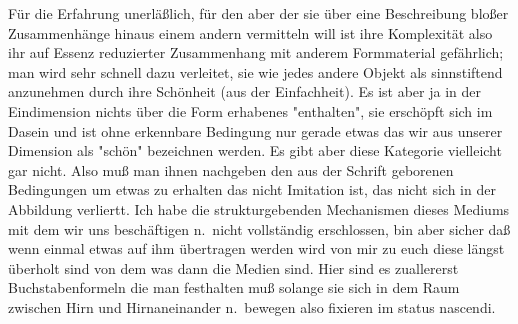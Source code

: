 \documentclass[
]{article}
\begin{document}
Für die Erfahrung unerläßlich, für den aber der sie über eine
Beschreibung bloßer Zusammenhänge hinaus einem andern vermitteln will
ist ihre Komplexität also ihr auf Essenz reduzierter Zusammenhang mit
anderem Formmaterial gefährlich; man wird sehr schnell dazu verleitet,
sie wie jedes andere Objekt als sinnstiftend anzunehmen durch ihre
Schönheit (aus der Einfachheit). Es ist aber ja in der Eindimension
nichts über die Form erhabenes "enthalten", sie erschöpft sich im Dasein
und ist ohne erkennbare Bedingung nur gerade etwas das wir aus unserer
Dimension als "schön" bezeichnen werden. Es gibt aber diese Kategorie
vielleicht gar nicht. Also muß man ihnen nachgeben den aus der Schrift
geborenen Bedingungen um etwas zu erhalten das nicht Imitation ist, das
nicht sich in der Abbildung verliertt. Ich habe die strukturgebenden
Mechanismen dieses Mediums mit dem wir uns beschäftigen n.~nicht
vollständig erschlossen, bin aber sicher daß wenn einmal etwas auf ihm
übertragen werden wird von mir zu euch diese längst überholt sind von
dem was dann die Medien sind. Hier sind es zuallererst Buchstabenformeln
die man festhalten muß solange sie sich in dem Raum zwischen Hirn und
Hirnaneinander n.~bewegen also fixieren im status nascendi.
\end{document}
